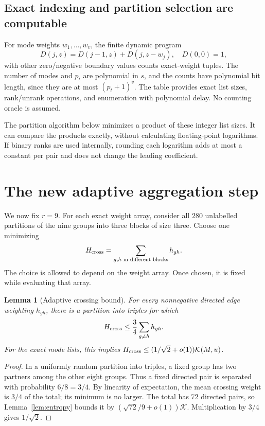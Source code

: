 \documentclass[11pt]{article}
\newtheorem{lemma}[theorem]{Lemma}
\theoremstyle{definition}\newtheorem{definition}[theorem]{Definition}
\theoremstyle{remark}\newtheorem{remark}[theorem]{Remark}
\newcommand{\K}{\mathcal K}
\begin{document}
\subsection{Exact indexing and partition selection are computable}

For mode weights $w_1,\ldots,w_v$, the finite dynamic program
\[
 D(j,z)=D(j-1,z)+D(j,z-w_j),\quad D(0,0)=1,
\]
with other zero/negative boundary values counts exact-weight tuples.
The number of modes and $p_t$ are polynomial in $s$, and the counts have
polynomial bit length, since they are at most $(p_t+1)^v$. The table provides
exact list sizes, rank/unrank operations, and enumeration with polynomial
delay. No counting oracle is assumed.

The partition algorithm below minimizes a product of these integer list
sizes. It can compare the products exactly, without calculating floating-point
logarithms. If binary ranks are used internally, rounding each logarithm adds
at most a constant per pair and does not change the leading coefficient.

\section{The new adaptive aggregation step}
\label{sec:adaptive}

We now fix $r=9$. For each exact weight array, consider all $280$ unlabelled
partitions of the nine groups into three blocks of size three. Choose one
minimizing
\begin{equation}
 H_{\rm cross}=\sum_{g,h\text{ in different blocks}}h_{gh}.\label{eq:cut}
\end{equation}
The choice is allowed to depend on the weight array. Once chosen, it is
fixed while evaluating that array.

\begin{lemma}[Adaptive crossing bound]\label{lem:partition}
For every nonnegative directed edge weighting $h_{gh}$, there is a partition
into triples for which
\begin{equation}
 H_{\rm cross}\le\frac34\sum_{g\ne h}h_{gh}.
 \label{eq:average-cut}
\end{equation}
For the exact mode lists, this implies
$H_{\rm cross}\le(1/\sqrt2+o(1))\K(M,u)$.
\end{lemma}
\begin{proof}
In a uniformly random partition into triples, a fixed group has two partners
among the other eight groups. Thus a fixed directed pair is separated with
probability $6/8=3/4$. By linearity of expectation, the mean crossing weight
is $3/4$ of the total; its minimum is no larger. The total has $72$ directed
pairs, so Lemma~\ref{lem:entropy} bounds it by
$(\sqrt{72}/9+o(1))\K$. Multiplication by $3/4$ gives $1/\sqrt2$.
\end{proof}
\end{document}
